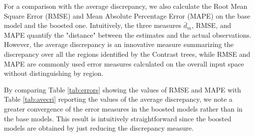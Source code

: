 \documentclass[a4,11pt]{article}
\begin{document}
For a comparison with the average discrepancy, we also calculate the Root Mean Square Error (RMSE) and Mean Absolute Percentage Error (MAPE) on the base model and the boosted one. Intuitively, the three measures $\bar{d}_m$, RMSE, and MAPE quantify the "distance" between the estimates and the actual observations. 
However, the average discrepancy is an innovative measure summarizing the discrepancy over all the regions identified by the Contrast trees, while RMSE and MAPE are commonly used error measures calculated on the overall input space without distinguishing by region. 

By comparing Table \ref{tab:errors} showing the values of RMSE and MAPE with Table \ref{tab:avecri} reporting the values of the average discrepancy, we note a greater convergence of the error measures in the boosted models rather than in the base models. This result is intuitively straightforward since the boosted models are obtained by just reducing the discrepancy measure. 
%
\end{document}
